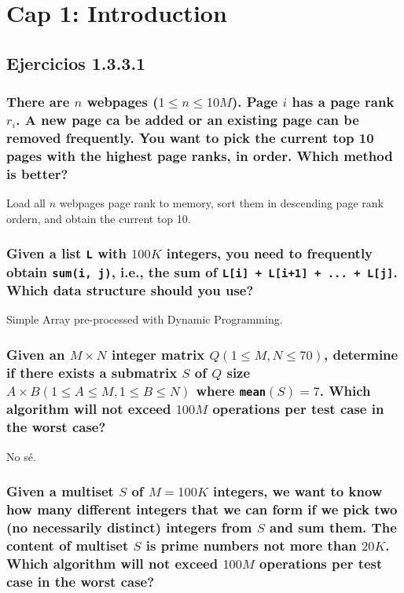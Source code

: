 \documentclass{article}
\begin{document}
\section{Cap 1: Introduction}

\subsection{Ejercicios 1.3.3.1}

\subsubsection{There are $n$ webpages ($1 \leq n \leq 10M $). Page $i$ has a page rank $r_{i}$. A new page ca be added or an existing page can be removed frequently. You want to pick the current top 10 pages with the highest page ranks, in order. Which method is better? }

Load all $n$ webpages page rank to memory, sort them in descending page rank ordern, and obtain the current top 10.

\subsubsection{Given a list \texttt{L} with $100K$ integers, you need to frequently obtain \texttt{sum(i, j)}, i.e., the sum of \texttt{L[i] + L[i+1] + ... + L[j]}. Which data structure should you use?  }

Simple Array pre-processed with Dynamic Programming.

\subsubsection{Given an $M \times N $ integer matrix $Q(1 \leq M, N \leq 70)$, determine if there exists a submatrix $S$ of $Q$ size $A \times B (1 \leq A \leq M, 1 \leq B \leq N)$ where \texttt{mean}$(S) = 7$. Which algorithm will not exceed $100 M$ operations per test case in the worst case?    }

No sé.

\subsubsection{Given a multiset $S$ of $M = 100K$ integers, we want to know how many different integers that we can form if we pick two (no necessarily distinct) integers from $S$ and sum them. The content of multiset $S$ is prime numbers not more than $20K$. Which algorithm will not exceed $100M$ operations per test case in the worst case?}
\end{document}
